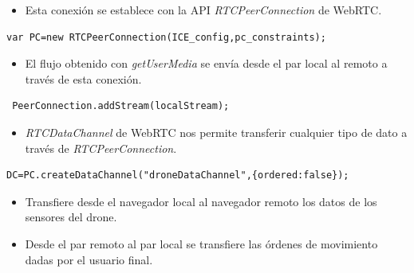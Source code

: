 \documentclass[notes,slidesec,a4]{seminar}
\begin{document}

\begin{hslide}
\begin{itemize}
\item Esta conexión se establece con la API \emph{RTCPeerConnection} de WebRTC.
\end{itemize}
\lstset{}
\begin{lstlisting}
var PC=new RTCPeerConnection(ICE_config,pc_constraints);
\end{lstlisting}

\begin{itemize}
\item El flujo obtenido con \emph{getUserMedia} se envía desde el par local al remoto a través de esta conexión.
\end{itemize}
\lstset{}
\begin{lstlisting}
 PeerConnection.addStream(localStream);
\end{lstlisting}
\end{hslide}


\begin{hslide}
\begin{itemize}
\item \emph{RTCDataChannel} de WebRTC nos permite transferir cualquier tipo de dato a través de \emph{RTCPeerConnection}.
\end{itemize}
\lstset{}
\begin{lstlisting}
DC=PC.createDataChannel("droneDataChannel",{ordered:false});
\end{lstlisting}

\begin{itemize}
\item Transfiere desde el navegador local al navegador remoto los datos de los sensores del drone.
\item Desde el par remoto al par local se transfiere las órdenes de movimiento dadas por el usuario final.
\end{itemize}
\end{hslide}


\end{document}
